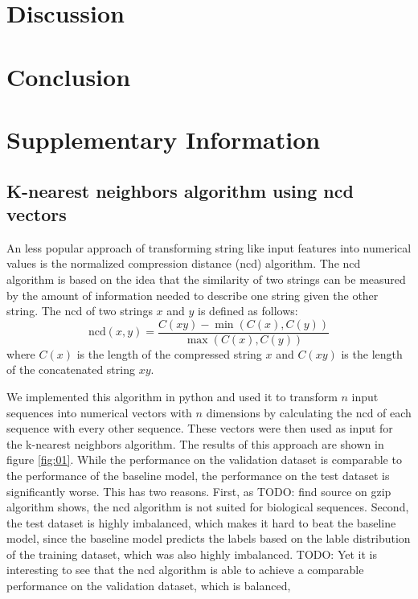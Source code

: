 \documentclass{bioinfo}
\begin{document}
\section{Discussion}
\lipsum[1]

\section{Conclusion}
\lipsum[1]

\section{Supplementary Information}
\lipsum[1]

\subsection{K-nearest neighbors algorithm using ncd vectors}
An less popular approach of transforming string like input features into numerical values is the normalized compression distance (ncd) algorithm. 
The ncd algorithm is based on the idea that the similarity of two strings can be measured by the amount of information needed to describe one string given the other string.
The ncd of two strings $x$ and $y$ is defined as follows:
\begin{equation}
	\text{ncd}(x,y) = \frac{C(xy)-\min(C(x),C(y))}{\max(C(x),C(y))}
\end{equation}
where $C(x)$ is the length of the compressed string $x$  and $C(xy)$ is the length of the concatenated string $xy$. 

We implemented this algorithm in python and used it to transform $n$ input sequences into numerical vectors with $n$ dimensions by 
calculating the ncd of each sequence with every other sequence. These vectors were then used as input for the  k-nearest neighbors algorithm.
The results of this approach are shown in figure \ref{fig:01}. While the performance on the validation dataset is comparable to the performance of the baseline model, 
the performance on the test dataset is significantly worse. This has two reasons. First, as TODO: find source on gzip algorithm
shows, the ncd algorithm is not suited for biological sequences. Second, the test dataset is highly imbalanced, which makes it hard to beat the baseline model, 
since the baseline model predicts the labels based on the lable distribution of the training dataset, which was also highly imbalanced.
TODO: Yet it is interesting to see that the ncd algorithm is able to achieve a comparable performance on the validation dataset, which is balanced,
\end{document}
